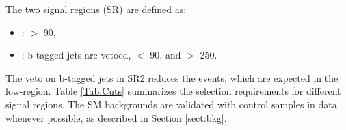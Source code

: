 The two signal regions (SR) are defined as:
\begin{itemize}
\item {\bf \binone}: \mttwo $>$ 90\GeV,
\item {\bf \bintwo}: b-tagged jets are vetoed, \mttwo $<$ 90\GeV, and \SumMT $>$ 250\GeV.
\end{itemize}
The veto on b-tagged jets in SR2 reduces the
\ttbar events, which
are expected in  the low-\mttwo region. Table \ref{Tab.Cuts} summarizes the selection requirements for different signal regions.
The SM backgrounds are validated with control samples in data whenever possible, as described in Section \ref{sect:bkg}.

